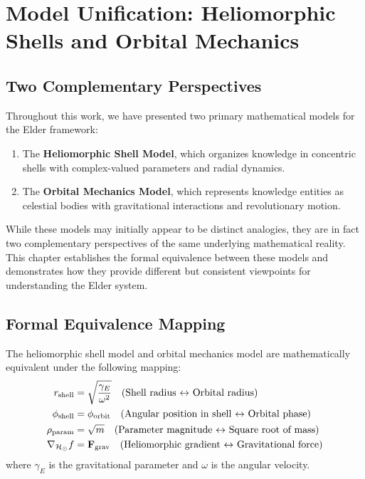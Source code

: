 \chapter{Model Unification: Heliomorphic Shells and Orbital Mechanics}

\section{Two Complementary Perspectives}

Throughout this work, we have presented two primary mathematical models for the Elder framework:

\begin{enumerate}
    \item The \textbf{Heliomorphic Shell Model}, which organizes knowledge in concentric shells with complex-valued parameters and radial dynamics.
    
    \item The \textbf{Orbital Mechanics Model}, which represents knowledge entities as celestial bodies with gravitational interactions and revolutionary motion.
\end{enumerate}

While these models may initially appear to be distinct analogies, they are in fact two complementary perspectives of the same underlying mathematical reality. This chapter establishes the formal equivalence between these models and demonstrates how they provide different but consistent viewpoints for understanding the Elder system.

\section{Formal Equivalence Mapping}

\begin{theorem}
The heliomorphic shell model and orbital mechanics model are mathematically equivalent under the following mapping:
\begin{align}
    r_{\text{shell}} &= \sqrt{\frac{\gamma_E}{\omega^2}} \quad \text{(Shell radius $\leftrightarrow$ Orbital radius)}\\
    \phi_{\text{shell}} &= \phi_{\text{orbit}} \quad \text{(Angular position in shell $\leftrightarrow$ Orbital phase)} \\
    \rho_{\text{param}} &= \sqrt{m} \quad \text{(Parameter magnitude $\leftrightarrow$ Square root of mass)} \\
    \nabla_{\mathcal{H}_{\odot}}f &= \mathbf{F}_{\text{grav}} \quad \text{(Heliomorphic gradient $\leftrightarrow$ Gravitational force)}
\end{align}
where $\gamma_E$ is the gravitational parameter and $\omega$ is the angular velocity.
\end{theorem}

